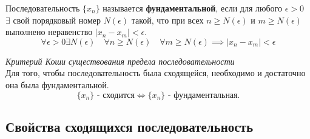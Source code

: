 \begin{definition}
  Последовательность $\{x_{n}\} $ называется \textbf{фундаментальной}, если для любого $\epsilon > 0$ $\exists $ свой порядковый номер $N(\epsilon)$ такой, что при всех $n \ge N(\epsilon)$ и $m \ge  N(\epsilon)$ выполнено неравенство $|x_{n} - x_{m}| < \epsilon$.
  \[
    \forall \epsilon > 0 \exists N(\epsilon) 
    \quad \forall n \ge N(\epsilon)
    \quad \forall m \ge N(\epsilon) 
    \implies |x_{n} - x_{m}| < \epsilon
  \]
\end{definition}

\begin{theorem}
  \textit{Критерий Коши существования предела последовательности} \\
  Для того, чтобы последовательность была сходящейся, необходимо и достаточно она была фундаментальной.
  \[
    \{x_{n}\} \text{ - сходится} \iff \{x_{n}\} \text{ - фундаментальная}
  .\] 
\end{theorem}

\subsection{Свойства сходящихся последовательность}

